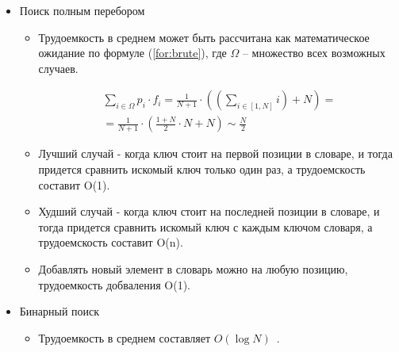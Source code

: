 \begin{itemize}
	\item Поиск полным перебором
	\begin{itemize}
		\item Трудоемкость в среднем может быть рассчитана как математическое ожидание по формуле (\ref{for:brute}), где $\Omega$ -- множество всех возможных случаев.
		
		\begin{equation}
			\label{for:brute}
			\begin{aligned}
				\sum\limits_{i \in \Omega} p_i \cdot f_i = \frac{1}{N + 1} \cdot ((\sum\limits_{i \in [1, N]}i) + N) = \\
				= \frac{1}{N + 1} \cdot (\frac{1 + N}{2} \cdot N + N) \sim \frac{N}{2}
			\end{aligned}
		\end{equation}
			
		
		\item Лучший случай - когда ключ стоит на первой позиции в словаре, и тогда придется сравнить искомый ключ только один раз, а трудоемскость составит O(1).
		
		\item Худший случай - когда ключ стоит на последней позиции в словаре, и тогда придется сравнить искомый ключ с каждым ключом словаря, а трудоемскость составит O(n).
		
		\item Добавлять новый элемент в словарь можно на любую позицию, трудоемкость добваления O(1).

	\end{itemize}


	\item Бинарный поиск
	\begin{itemize}
	\item Трудоемкость в среднем составляет $O(\log{N})$~\cite{second_article}.
	

\end{itemize}
\end{itemize}
